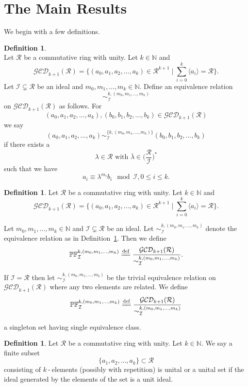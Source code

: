\documentclass[12pt]{amsart}
\newcommand{\gl}{\lambda}
\newcommand{\subs}{\subset}
\newcommand{\mbb}{\mathbb}
\newcommand{\mcl}{\mathcal}
\newcommand{\ol}{\overline}
\newcommand{\us}{\underset}
\newcommand{\os}{\overset}
\newcommand{\I}{\mcl I}
\newcommand{\R}{\mcl R}
\newcommand{\eqdef}{\overset{\mathrm{def}}{=\joinrel=}}
\newcommand{\equ}[1]{%
\begin{equation*}
#1
\end{equation*}
}
\theoremstyle{plain}
\theoremstyle{definition}
\newtheorem{defn}[theorem]{Definition}
\theoremstyle{remark}
\numberwithin{equation}{section}
\begin{document}
\section{\bf{The Main Results}}
We begin with a few definitions. 


\begin{defn}
	\label{defn:ProjSpaceRelation}
	~\\
	Let $\R$ be a commutative ring with unity. Let $k\in \mbb{N}$ and \equ{\mcl{GCD}_{k+1}(\R)=\{(a_0,a_1,a_2,\ldots,a_k)\in \R^{k+1}\mid \us{i=0}{\os{k}{\sum}}\langle a_i\rangle=\R\}.} Let $\I \subsetneq \R$ be an ideal
	and $m_0,m_1,\ldots,m_k\in \mbb{N}$. Define an equivalence relation \equ{\sim^{k,(m_0,m_1,\ldots,m_k)}_{\I}} on $\mcl{GCD}_{k+1}(\R)$
	as follows. For \equ{(a_0,a_1,a_2,\ldots,a_k),(b_0,b_1,b_2,\ldots,b_k) \in \mcl{GCD}_{k+1}(\R)} we say \equ{(a_0,a_1,a_2,\ldots,a_k)\sim^{\{k,(m_0,m_1,\ldots,m_k)\}}_{\I}(b_0,b_1,b_2,\ldots,b_k)} if there exists a \equ{\gl\in \R\text{ with }\ol{\gl}\in \bigg(\frac{\R}{\I}\bigg)^{*}} such that we have 
	\equ{a_i \equiv \gl^{m_i}b_i \mod \I,0\leq i\leq k.}  
\end{defn}

\begin{defn}
	\label{defn:GenProjSpace}
	Let $\R$ be a commutative ring with unity. Let $k\in \mbb{N}$ and \equ{\mcl{GCD}_{k+1}(\R)=\{(a_0,a_1,a_2,\ldots,a_k)\in \R^{k+1}\mid \us{i=0}{\os{k}{\sum}}\langle a_i\rangle=\R\}.}
	Let $m_0,m_1,\ldots,m_k\in \mbb{N}$ and $\I \subsetneq \R$ be an ideal. Let $\sim^{k,(m_0,m_1,\ldots,m_k)}_{\I}$ denote the equivalence relation as in Definition~\ref{defn:ProjSpaceRelation}. Then we define 
	\equ{\mbb{PF}^{k,(m_0,m_1,\ldots,m_k)}_{\I}\eqdef \frac{\mcl{GCD}_{k+1}(\R)}{\sim^{k,(m_0,m_1,\ldots,m_k)}_{\I}}.}
	If $\mcl{I}=\R$ then let $\sim^{k,(m_0,m_1,\ldots,m_k)}_{\I}$ be the trivial equivalence relation on $\mcl{GCD}_{k+1}(\R)$ where any two elements are related.
	We define \equ{\mbb{PF}^{k,(m_0,m_1,\ldots,m_k)}_{\I} \eqdef \frac{\mcl{GCD}_{k+1}(\R)}{\sim^{k,(m_0,m_1,\ldots,m_k)}_{\I}}}
	a singleton set having single equivalence class.
\end{defn}
\begin{defn}
	\label{defn:unitalset}
	Let $\R$ be a commutative ring with unity. Let $k\in \mbb{N}$. We say a finite subset 
	\equ{\{a_1,a_2,\ldots,a_k\}\subs \R} consisting of $k\operatorname{-}$elements (possibly with repetition) 
	is unital or a unital set if the ideal generated by the elements of the set is a unit ideal.
\end{defn}
\end{document}

